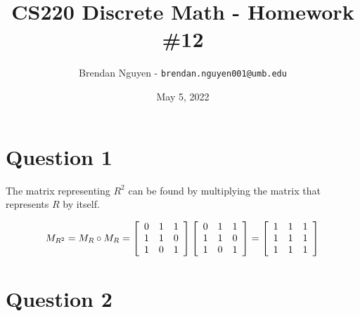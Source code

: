 \documentclass[letterpaper, 12pt]{article}
\title{CS220 Discrete Math - Homework \#12}
\author{Brendan Nguyen - \texttt{brendan.nguyen001@umb.edu}}
\date{May 5, 2022}
\begin{document}
\maketitle

\section*{Question 1}
The matrix representing $R^2$ can be found by multiplying the matrix that represents $R$ by itself.

\[
M_{R^2} = M_R \circ M_R = 
\left[
\begin{array}{c c c}
    0 & 1 & 1 \\
    1 & 1 & 0 \\
    1 & 0 & 1
\end{array}
\right]
\left[
\begin{array}{c c c}
    0 & 1 & 1 \\
    1 & 1 & 0 \\
    1 & 0 & 1
\end{array}
\right]
= 
\left[
\begin{array}{c c c}
    1 & 1 & 1 \\
    1 & 1 & 1 \\
    1 & 1 & 1
\end{array}
\right]
\]

\section*{Question 2}
\end{document}
